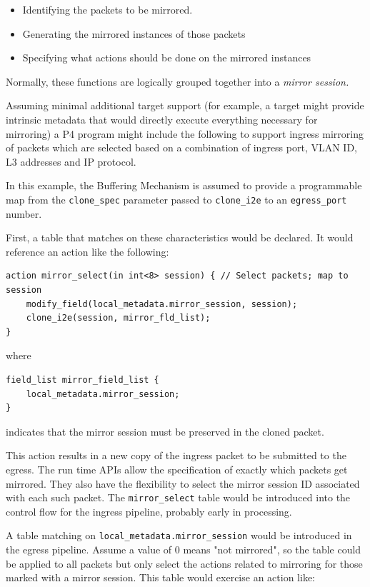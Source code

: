 \documentclass[12pt]{article}
\begin{document}
\begin{itemize}
\item
Identifying the packets to be mirrored.
\item
Generating the mirrored instances of those packets
\item
Specifying what actions should be done on the mirrored instances
\end{itemize}

Normally, these functions are logically grouped together into a \textit{mirror session.}

Assuming minimal additional target support (for example, a target might provide 
intrinsic metadata that would directly execute everything necessary for mirroring) 
a P4 program might include the following to support ingress mirroring of packets 
which are selected based on a combination of ingress port, VLAN ID, L3 addresses 
and IP protocol.

In this example, the Buffering Mechanism is assumed to provide a programmable 
map from the \texttt{clone_spec} parameter passed to \texttt{clone_i2e} to an 
\texttt{egress_port} number.

First, a table that matches on these characteristics would be declared. It 
would reference an action like the following:

\begin{lstlisting}[style=P4style]
action mirror_select(in int<8> session) { // Select packets; map to session
    modify_field(local_metadata.mirror_session, session);
    clone_i2e(session, mirror_fld_list);
}
\end{lstlisting}

where

\begin{lstlisting}[style=P4style]
field_list mirror_field_list {
    local_metadata.mirror_session;
}
\end{lstlisting}

indicates that the mirror session must be preserved in the cloned packet.

This action results in a new copy of the ingress packet to be submitted to 
the egress. The run time APIs allow the specification of exactly which packets 
get mirrored. They also have the flexibility to select the mirror session 
ID associated with each such packet. The \texttt{mirror_select} table would be introduced 
into the control flow for the ingress pipeline, probably early in processing. 

A table matching on \texttt{local_metadata.mirror_session} would be introduced 
in the egress pipeline. Assume a value of 0 means "not mirrored", so the table 
could be applied to all packets but only select the actions related to mirroring 
for those marked with a mirror session. This table would exercise an action 
like:
\end{document}
